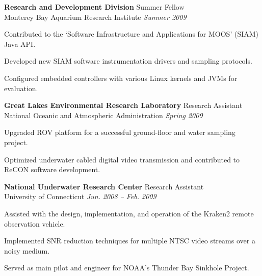 \documentclass[article]{resume}
\begin{document}
{    \textbf{Research and Development Division} \hfill Summer Fellow \\ 
    Monterey Bay Aquarium Research Institute \hfill \textsl{Summer 2009}  \\
    \vspace{ -2 mm}	
    \begin{list2}
	\item Contributed to the `Software Infrastructure and Applications for MOOS' (SIAM) Java API. 
	\item Developed new SIAM software instrumentation drivers and sampling protocols.
	\item Configured embedded controllers with various Linux kernels and JVMs for evaluation.
    \end{list2}\vspace{-2mm}
    
    \textbf{Great Lakes Environmental Research Laboratory } \hfill  Research Assistant \\ 
	National Oceanic and Atmospheric Administration \hfill \textsl{Spring 2009} \\
    \vspace{ -2 mm}	
    \begin{list2}
	\item Upgraded ROV platform for a successful ground-floor and water sampling project.
	\item Optimized underwater cabled digital video transmission and contributed to ReCON software development.
    \end{list2}\vspace{-2mm}

    \textbf{National Underwater Research Center} \hfill Research Assistant \\ 
	University of Connecticut \hfill \textsl{Jun. 2008 -- Feb. 2009} \\
    \vspace{ -2 mm}	
    \begin{list2}
	\item Assisted with the design, implementation, and operation of the Kraken2 remote observation vehicle.
	\item Implemented SNR reduction techniques for multiple NTSC video streams over a noisy medium.
	\item Served as main pilot and engineer for NOAA's Thunder Bay Sinkhole Project. 
    \end{list2}\vspace{-2mm}

   \pagebreak

}
\end{document}
